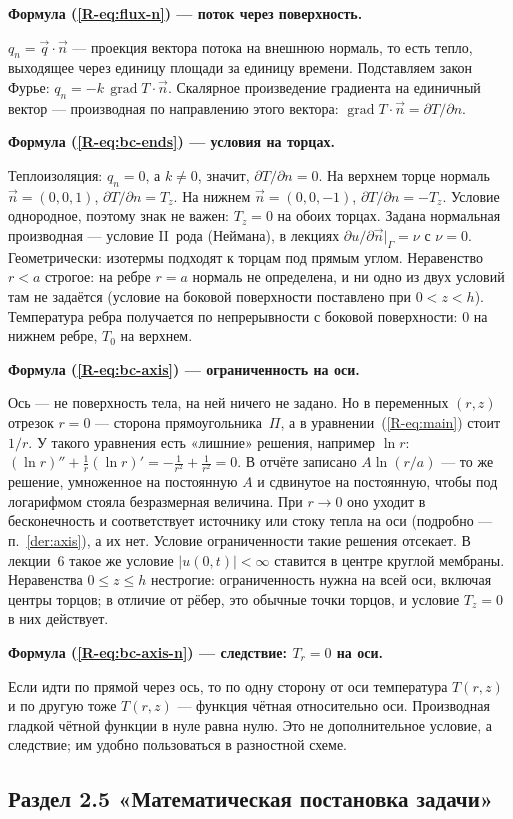 \documentclass[a4paper,12pt]{article}
\renewcommand{\le}{\leqslant}
\newcommand{\rf}[1]{(\ref*{R-#1})}
\DeclareMathOperator{\Grad}{grad}
\newcommand{\fhead}[2]{\par\medskip\textbf{Формула #1 — #2.}\par\nopagebreak[4]}
\begin{document}
\fhead{\rf{eq:flux-n}}{поток через поверхность}
$q_n=\vec q\cdot\vec n$ — проекция вектора потока на внешнюю нормаль, то
есть тепло, выходящее через единицу площади за единицу времени. Подставляем
закон Фурье: $q_n=-k\,\Grad T\cdot\vec n$. Скалярное произведение градиента
на единичный вектор — производная по направлению этого вектора:
$\Grad T\cdot\vec n=\partial T/\partial n$.

\fhead{\rf{eq:bc-ends}}{условия на торцах}
Теплоизоляция: $q_n=0$, а $k\ne0$, значит, $\partial T/\partial n=0$.
На верхнем торце нормаль $\vec n=(0,0,1)$, $\partial T/\partial n=T_z$.
На нижнем $\vec n=(0,0,-1)$, $\partial T/\partial n=-T_z$. Условие
однородное, поэтому знак не важен: $T_z=0$ на обоих торцах. Задана
нормальная производная — условие II~рода (Неймана), в лекциях
$\partial u/\partial\vec n|_\Gamma=\nu$ с $\nu=0$. Геометрически: изотермы
подходят к торцам под прямым углом. Неравенство $r<a$ строгое: на ребре
$r=a$ нормаль не определена, и ни одно из двух условий там не задаётся
(условие на боковой поверхности поставлено при $0<z<h$). Температура ребра
получается по непрерывности с боковой поверхности: 0 на нижнем ребре, $T_0$
на верхнем.

\fhead{\rf{eq:bc-axis}}{ограниченность на оси}
Ось — не поверхность тела, на ней ничего не задано. Но в переменных $(r,z)$
отрезок $r=0$ — сторона прямоугольника~$\Pi$, а в уравнении~\rf{eq:main}
стоит $1/r$. У такого уравнения есть «лишние» решения, например $\ln r$:
$(\ln r)''+\frac1r(\ln r)'=-\frac{1}{r^2}+\frac{1}{r^2}=0$. В отчёте
записано $A\ln(r/a)$ — то же решение, умноженное на постоянную $A$ и
сдвинутое на постоянную, чтобы под логарифмом стояла безразмерная величина.
При $r\to0$ оно уходит в бесконечность и соответствует источнику или стоку
тепла на оси (подробно — п.~\ref{der:axis}), а их нет. Условие
ограниченности такие решения отсекает. В лекции~6 такое же условие
$|u(0,t)|<\infty$ ставится в центре круглой мембраны. Неравенства
$0\le z\le h$ нестрогие: ограниченность нужна на всей оси, включая центры
торцов; в отличие от рёбер, это обычные точки торцов, и условие $T_z=0$ в
них действует.

\fhead{\rf{eq:bc-axis-n}}{следствие: $T_r=0$ на оси}
Если идти по прямой через ось, то по одну сторону от оси температура
$T(r,z)$ и по другую тоже $T(r,z)$ — функция чётная относительно оси.
Производная гладкой чётной функции в нуле равна нулю. Это не дополнительное
условие, а следствие; им удобно пользоваться в разностной схеме.

\subsection{Раздел 2.5 «Математическая постановка задачи»}
\end{document}
